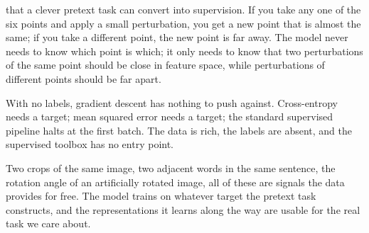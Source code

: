 
 that a clever pretext task can convert into supervision.
If you take any one of the six points and apply a small perturbation, you get a new point that is almost the same; if you take a different point, the new point is far away.
The model never needs to know which point is which; it only needs to know that two perturbations of the same point should be close in feature space, while perturbations of different points should be far apart.

With no labels, gradient descent has nothing to push against.
Cross-entropy needs a target; mean squared error needs a target; the standard supervised pipeline halts at the first batch.
The data is rich, the labels are absent, and the supervised toolbox has no entry point.

Two crops of the same image, two adjacent words in the same sentence, the rotation angle of an artificially rotated image, all of these are signals the data provides for free.
The model trains on whatever target the pretext task constructs, and the representations it learns along the way are usable for the real task we care about.

\begin{marginfigure}
\centering
{}
\caption{Two perturbations of $x_1$ (light grey) form a positive pair pulled together (solid). A perturbation of a different point $x_5$ is a negative pushed apart (dashed). The data, not the human, supplies the supervision.}
\label{fig:ssl_handson_pull_push}
\end{marginfigure}

